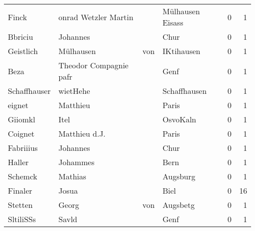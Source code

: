 \begin{tabular}{llllrr}
                    Finck &               onrad Wetzler Martin &             &                            Mülhausen Eisass &          0 &         1 \\
                  Bbriciu &                           Johannes &             &                                        Chur &          0 &         1 \\
                Geistlich &                          Mülhausen &         von &                                  IKtihausen &          0 &         1 \\
                     Beza &             Theodor Compagnie pafr &             &                                        Genf &          0 &         1 \\
             Schaffhauser &                           wietHehe &             &                                Schaffhausen &          0 &         1 \\
                   eignet &                           Matthieu &             &                                       Paris &          0 &         1 \\
                  Giiomkl &                               Itel &             &                                    OsvoKaln &          0 &         1 \\
                  Coignet &                      Matthieu d.J. &             &                                       Paris &          0 &         1 \\
                Fabriiius &                           Johannes &             &                                        Chur &          0 &         1 \\
                   Haller &                           Johammes &             &                                        Bern &          0 &         1 \\
                  Schemck &                            Mathias &             &                                    Augsburg &          0 &         1 \\
                  Finaler &                              Josua &             &                                        Biel &          0 &        16 \\
                  Stetten &                              Georg &         von &                                    Augsbetg &          0 &         1 \\
                SltiliSSs &                              Savld &             &                                        Genf &          0 &         1 \\

\end{tabular}

